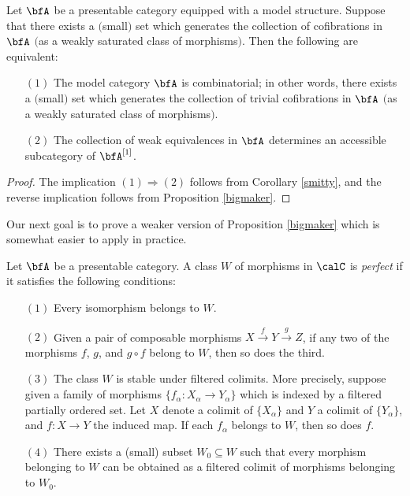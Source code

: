 \begin{corollary}\label{uryt}
Let $\bfA$ be a presentable category equipped with a model structure. Suppose that there exists
a $($small$)$ set which generates the collection of cofibrations in $\bfA$ $($as a weakly saturated class of morphisms$)$. Then the following are equivalent:
\begin{itemize}
\item[$(1)$] The model category $\bfA$ is combinatorial; in other words, there exists a $($small$)$ set which generates the collection of trivial cofibrations in $\bfA$ $($as a weakly saturated class of morphisms$)$.
\item[$(2)$] The collection of weak equivalences in $\bfA$ determines an accessible subcategory
of $\bfA^{[1]}$. 
\end{itemize}
\end{corollary}

\begin{proof}
The implication $(1) \Rightarrow (2)$ follows from Corollary \ref{smitty}, and the reverse implication follows from Proposition \ref{bigmaker}.
\end{proof}

Our next goal is to prove a weaker version of Proposition \ref{bigmaker} which is somewhat easier to apply in practice.

\begin{definition}\label{perfequiv}
Let $\bfA$ be a presentable category. A class $W$ of morphisms in $\calC$ is {\it perfect}
if it satisfies the following conditions:

\begin{itemize}
\item[$(1)$] Every isomorphism belongs to $W$.
\item[$(2)$] Given a pair of composable morphisms $X \stackrel{f}{\rightarrow} Y \stackrel{g}{\rightarrow} Z$, if any two of the morphisms $f$, $g$, and $g \circ f$ belong to $W$, then so does the third.
\item[$(3)$] The class $W$ is stable under filtered colimits. More precisely, suppose given a family of morphisms $\{ f_{\alpha}: X_{\alpha} \rightarrow Y_{\alpha} \}$ which is indexed by a filtered partially ordered set. Let $X$ denote a colimit of $\{ X_{\alpha} \}$ and $Y$ a colimit of
$\{ Y_{\alpha} \}$, and $f: X \rightarrow Y$ the induced map. If each $f_{\alpha}$ belongs to $W$, then so does $f$. 
\item[$(4)$] There exists a (small) subset $W_0 \subseteq W$ such that every morphism belonging to $W$ can be obtained as a filtered colimit of morphisms belonging to $W_0$.
\end{itemize}
\end{definition}

